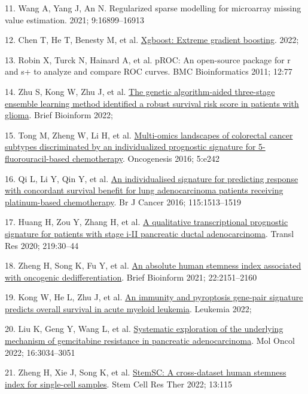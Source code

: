 \documentclass[
  12pt,
]{book}
\newlength{\cslhangindent}
\newlength{\cslentryspacingunit} %
\newenvironment{CSLReferences}[2] %
 {%
  \setlength{\parindent}{0pt}
  \ifodd #1
  \let\oldpar\par
  \def\par{\hangindent=\cslhangindent\oldpar}
  \fi
  \setlength{\parskip}{#2\cslentryspacingunit}
 }%
 {}
\begin{document}
\begin{CSLReferences}{0}{0}
\leavevmode{}%
11. Wang A, Yang J, An N. Regularized sparse modelling for microarray missing value estimation. 2021; 9:16899--16913

\leavevmode{}%
12. Chen T, He T, Benesty M, et al. \href{https://CRAN.R-project.org/package=xgboost}{Xgboost: Extreme gradient boosting}. 2022;

\leavevmode{}%
13. Robin X, Turck N, Hainard A, et al. pROC: An open-source package for r and s+ to analyze and compare ROC curves. BMC Bioinformatics 2011; 12:77

\leavevmode{}%
14. Zhu S, Kong W, Zhu J, et al. \href{https://doi.org/10.1093/bib/bbac344}{The genetic algorithm-aided three-stage ensemble learning method identified a robust survival risk score in patients with glioma}. Brief Bioinform 2022;

\leavevmode{}%
15. Tong M, Zheng W, Li H, et al. \href{https://doi.org/10.1038/oncsis.2016.51}{Multi-omics landscapes of colorectal cancer subtypes discriminated by an individualized prognostic signature for 5-fluorouracil-based chemotherapy}. Oncogenesis 2016; 5:e242

\leavevmode{}%
16. Qi L, Li Y, Qin Y, et al. \href{https://doi.org/10.1038/bjc.2016.370}{An individualised signature for predicting response with concordant survival benefit for lung adenocarcinoma patients receiving platinum-based chemotherapy}. Br J Cancer 2016; 115:1513--1519

\leavevmode{}%
17. Huang H, Zou Y, Zhang H, et al. \href{https://doi.org/10.1016/j.trsl.2020.02.004}{A qualitative transcriptional prognostic signature for patients with stage i-II pancreatic ductal adenocarcinoma}. Transl Res 2020; 219:30--44

\leavevmode{}%
18. Zheng H, Song K, Fu Y, et al. \href{https://doi.org/10.1093/bib/bbz174}{An absolute human stemness index associated with oncogenic dedifferentiation}. Brief Bioinform 2021; 22:2151--2160

\leavevmode{}%
19. Kong W, He L, Zhu J, et al. \href{https://doi.org/10.1038/s41375-022-01662-6}{An immunity and pyroptosis gene-pair signature predicts overall survival in acute myeloid leukemia}. Leukemia 2022;

\leavevmode{}%
20. Liu K, Geng Y, Wang L, et al. \href{https://doi.org/10.1002/1878-0261.13279}{Systematic exploration of the underlying mechanism of gemcitabine resistance in pancreatic adenocarcinoma}. Mol Oncol 2022; 16:3034--3051

\leavevmode{}%
21. Zheng H, Xie J, Song K, et al. \href{https://doi.org/10.1186/s13287-022-02803-5}{StemSC: A cross-dataset human stemness index for single-cell samples}. Stem Cell Res Ther 2022; 13:115

\end{CSLReferences}
\end{document}
